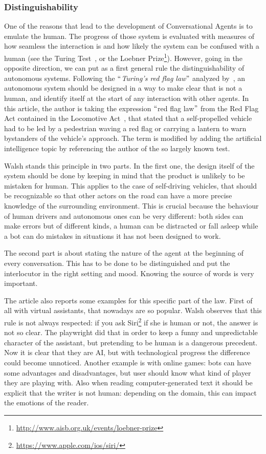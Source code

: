\subsubsection{Distinguishability}
One of the reasons that lead to the development of Conversational Agents is to emulate the human. The progress of those system is evaluated with measures of how seamless the interaction is and how likely the system can be confused with a human (see the Turing Test~\cite{turing1950computing}, or the Loebner Prize\footnote{\url{http://www.aisb.org.uk/events/loebner-prize}}). However, going in the opposite direction, we can put as a first general rule the distinguishability of autonomous systems. Following the $``$\textit{Turing's red flag law}$"$  analyzed by~\cite{walsh2016turing}, an autonomous system should be designed in a way to make clear that is not a human, and identify itself at the start of any interaction with other agents. In this article, the author is taking the expression $``$red flag law$"$  from the Red Flag Act contained in the Locomotive Act~\cite{rickards1817statutes}, that stated that a self-propelled vehicle had to be led by a pedestrian waving a red flag or carrying a lantern to warn bystanders of the vehicle's approach. The term is modified by adding the artificial intelligence topic by referencing the author of the so largely known test.

Walsh stands this principle in two parts. In the first one, the design itself of the system should be done by keeping in mind that the product is unlikely to be mistaken for human. This applies to the case of self-driving vehicles, that should be recognizable so that other actors on the road can have a more precise knowledge of the surrounding environment. This is crucial because the behaviour of human drivers and autonomous ones can be very different: both sides can make errors but of different kinds, a human can be distracted or fall asleep while a bot can do mistakes in situations it has not been designed to work.

The second part is about stating the nature of the agent at the beginning of every conversation. This has to be done to be distinguished and put the interlocutor in the right setting and mood. Knowing the source of words is very important.

The article also reports some examples for this specific part of the law. First of all with virtual assistants, that nowadays are so popular. Walsh observes that this rule is not always respected: if you ask Siri\footnote{\url{https://www.apple.com/ios/siri/}} if she is human or not, the answer is not so clear. The playwright did that in order to keep a funny and unpredictable character of the assistant, but pretending to be human is a dangerous precedent. Now it is clear that they are AI, but with technological progress the difference could become unnoticed. Another example is with online games: bots can have some advantages and disadvantages, but user should know what kind of player they are playing with. Also when reading computer-generated text it should be explicit that the writer is not human: depending on the domain, this can impact the emotions of the reader.

